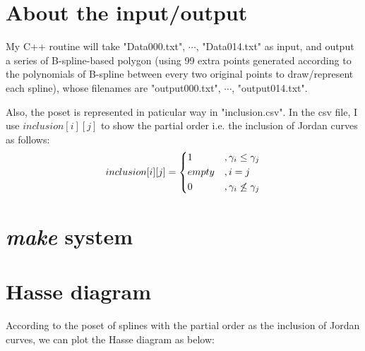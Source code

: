 \documentclass[]{article}
\begin{document}
\section{About the input/output}
\par
My C++ routine will take "Data000.txt", $\cdots$, "Data014.txt" as input, and output a series of B-spline-based polygon
(using 99 extra points generated according to the polynomials of B-spline between every two original points to draw/represent each spline), 
whose filenames are "output000.txt", $\cdots$, "output014.txt".\par
Also, the poset is represented in paticular way in "inclusion.csv". 
In the csv file, I use $inclusion[i][j]$ to show the partial order i.e. the inclusion of Jordan curves as follows:
$$inclusion[i][j] = \begin{dcases}
	1 &, \gamma_i \leq \gamma_j \\
	empty &, i = j \\
	0 &, \gamma_i \not\leq \gamma_j
\end{dcases}$$




\section{\textit{make} system}



\section{Hasse diagram}
According to the poset of splines with the partial order as the inclusion of Jordan curves, 
we can plot the Hasse diagram as below:\\
\end{document}
